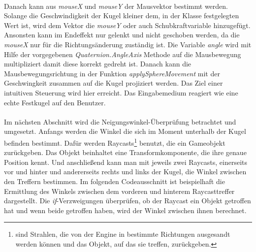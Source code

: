 

\paragraph{}
Danach kann aus \textit{mouseX} und \textit{mouseY} der Mausvektor bestimmt werden. Solange die Geschwindigkeit der Kugel kleiner dem, in der Klasse  festgelegten Wert ist, wird dem Vektor die \textit{mouseY} oder auch Schubkraftvariable hinzugefügt. Ansonsten kann im Endeffekt nur gelenkt und nicht geschoben werden, da die \textit{mouseX} nur für die Richtungsänderung zuständig ist. Die Variable \textit{angle} wird mit Hilfe der vorgegebenen \textit{Quaternion.AngleAxis} Methode auf die Mausbewegung multipliziert damit diese korrekt gedreht ist. Danach kann die Mausbewegungsrichtung in der Funktion \textit{applySphereMovement} mit der Geschwingkeit zusammen auf die Kugel projiziert werden. Das Ziel einer intuitiven Steuerung wird hier erreicht. Das Eingabemedium reagiert wie eine echte Festkugel auf den Benutzer.



\paragraph{}
Im nächsten Abschnitt wird die Neigungswinkel-Überprüfung betrachtet und umgesetzt. Anfangs werden die Winkel die sich im Moment unterhalb der Kugel befinden bestimmt. Dafür werden Raycasts\footnote{ sind Strahlen, die von der Engine in bestimmte Richtungen ausgesandt werden können und das Objekt, auf das sie treffen, zurückgeben.} benutzt, die ein Gameobjekt zurückgeben. Das Objekt beinhaltet eine Transformkomponente, die ihre genaue Position kennt. Und anschließend kann man mit jeweils zwei Raycasts, einerseits vor und hinter und andererseits rechts und links der Kugel, die Winkel zwischen den Treffern bestimmen. Im folgenden Codeausschnitt ist beispielhaft die Ermittlung des Winkels zwischen dem vorderen und hinterem Raycasttreffer dargestellt. Die \textit{if}-Verzweigungen überprüfen, ob der Raycast ein Objekt getroffen hat und wenn beide getroffen haben, wird der Winkel zwischen ihnen berechnet.



